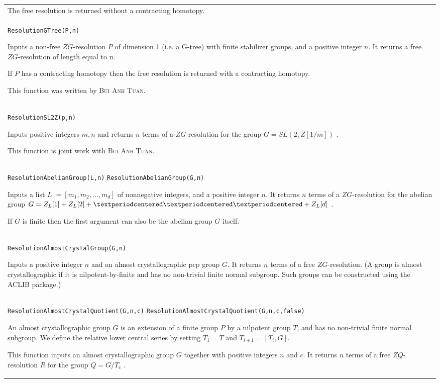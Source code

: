 \documentclass[a4paper,11pt]{report}
\begin{document}
{\begin{center}
\begin{tabular}{|l|}
 The free resolution is returned without a contracting homotopy. \\
 \index{ResolutionGTree} \texttt{ResolutionGTree(P,n)} 

 Inputs a non-free $ZG$-resolution $P$ of dimension 1 (i.e. a G-tree) with finite stabilizer groups, and a positive
integer $n$. It returns a free $ZG$-resolution of length equal to n. 

 If $P$ has a contracting homotopy then the free resolution is returned with a
contracting homotopy. 

 This function was written by \textsc{ Bui Anh Tuan}. \\
 \index{ResolutionSL2Z} \texttt{ResolutionSL2Z(p,n)} 

 Inputs positive integers $m, n$ and returns $n$ terms of a $ZG$-resolution for the group $G=SL(2,Z[1/m])$ . 

 

 This function is joint work with \textsc{Bui Anh Tuan}. \\
 \index{ResolutionAbelianGroup} \texttt{ResolutionAbelianGroup(L,n)} \texttt{ResolutionAbelianGroup(G,n)} 

 Inputs a list $L:=[m_1,m_2, ..., m_d]$ of nonnegative integers, and a positive integer $n$. It returns $n$ terms of a $ZG$-resolution for the abelian group $G=Z_L[1]+Z_L[2]+{\textperiodcentered}{\textperiodcentered}{\textperiodcentered}+Z_L[d]$ . 

 If $G$ is finite then the first argument can also be the abelian group $G$ itself. \\
 \index{ResolutionAlmostCrystalGroup} \texttt{ResolutionAlmostCrystalGroup(G,n)} 

 Inputs a positive integer $n$ and an almost crystallographic pcp group $G$. It returns $n$ terms of a free $ZG$-resolution. (A group is almost crystallographic if it is nilpotent-by-finite
and has no non-trivial finite normal subgroup. Such groups can be constructed
using the ACLIB package.) \\
 \index{ResolutionAlmostCrystalQuotient} \texttt{ResolutionAlmostCrystalQuotient(G,n,c)} \texttt{ResolutionAlmostCrystalQuotient(G,n,c,false)} 

 An almost crystallographic group $G$ is an extension of a finite group $P$ by a nilpotent group $T$, and has no non-trivial finite normal subgroup. We define the relative lower
central series by setting $T_1=T$ and $T_{i+1}=[T_i,G]$.

 This function inputs an almost crystallographic group $G$ together with positive integers $n$ and $c$. It returns $n$ terms of a free $ZQ$-resolution $R$ for the group $Q=G/T_c$ .


\end{tabular}
\end{center}}
\end{document}
